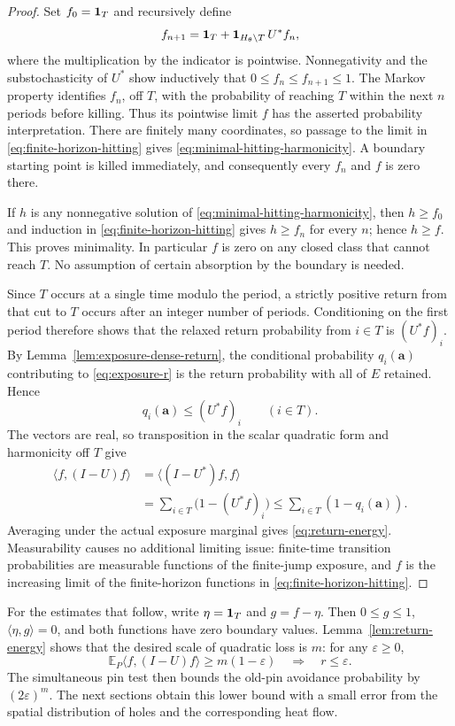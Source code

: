 \begin{proof}
Set \(f_0=\mathbf 1_T\) and recursively define
\begin{equation}
 f_{n+1}=\mathbf 1_T+\mathbf 1_{H_\theta\setminus T}\,U^*f_n,
 \label{eq:finite-horizon-hitting}
\end{equation}
where the multiplication by the indicator is pointwise.
Nonnegativity and the substochasticity of \(U^*\) show inductively
that \(0\le f_n\le f_{n+1}\le1\).  The Markov property identifies
\(f_n\), off \(T\), with the probability of reaching \(T\)
within the next \(n\) periods before killing.  Thus its pointwise
limit \(f\) has the asserted probability interpretation.  There are
finitely many coordinates, so passage to the limit in
\eqref{eq:finite-horizon-hitting} gives
\eqref{eq:minimal-hitting-harmonicity}.  A boundary starting point is
killed immediately, and consequently every \(f_n\) and \(f\) is
zero there.

If \(h\) is any nonnegative solution of
\eqref{eq:minimal-hitting-harmonicity}, then \(h\ge f_0\) and
induction in \eqref{eq:finite-horizon-hitting} gives \(h\ge f_n\)
for every \(n\); hence \(h\ge f\).  This proves minimality.
In particular \(f\) is zero on any closed class that cannot reach
\(T\).  No assumption of certain absorption by the boundary is
needed.

Since \(T\) occurs at a single time modulo the period, a strictly
positive return from that cut to \(T\) occurs after an integer number
of periods.  Conditioning on the first period therefore shows that
the relaxed return probability from \(i\in T\) is \((U^*f)_i\).
By Lemma~\ref{lem:exposure-dense-return}, the conditional probability
\(q_i(\mathbf a)\) contributing to \eqref{eq:exposure-r} is the
return probability with all of \(E\) retained.  Hence
\[
 q_i(\mathbf a)\le (U^*f)_i\qquad(i\in T).
\]
The vectors are real, so transposition in the scalar quadratic form
and harmonicity off \(T\) give
\begin{align*}
 \langle f,(I-U)f\rangle
   &=\langle (I-U^*)f,f\rangle\\
   &=\sum_{i\in T}\bigl(1-(U^*f)_i\bigr)
    \le\sum_{i\in T}(1-q_i(\mathbf a)).
\end{align*}
Averaging under the actual exposure marginal gives
\eqref{eq:return-energy}.  Measurability causes no additional
limiting issue: finite-time transition probabilities are measurable
functions of the finite-jump exposure, and \(f\) is the increasing
limit of the finite-horizon functions in
\eqref{eq:finite-horizon-hitting}.
\end{proof}

For the estimates that follow, write \(\eta=\mathbf 1_T\) and \(g=f-\eta\).
Then \(0\le g\le1\), \(\langle\eta,g\rangle=0\), and both
functions have zero boundary values.  Lemma~\ref{lem:return-energy}
shows that the desired scale of quadratic loss is \(m\): for any
\(\varepsilon\ge0\),
\[
 \mathbb E_P\langle f,(I-U)f\rangle\ge m(1-\varepsilon)
 \quad\Longrightarrow\quad r\le\varepsilon.
\]
The simultaneous pin test then bounds the old-pin avoidance probability
by \((2\varepsilon)^m\).  The next sections obtain this lower bound
with a small error from the spatial distribution of holes and the
corresponding heat flow.
